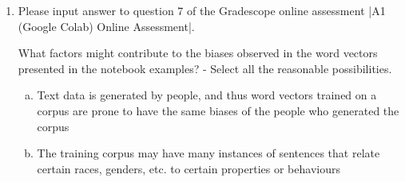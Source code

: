 \begin{enumerate}[1.]
\item {}

Please input answer to question 7 of the Gradescope online assessment |A1 (Google Colab) Online Assessment|.

What factors might contribute to the biases observed in the word vectors presented in the notebook examples? - Select all the reasonable possibilities.

\begin{enumerate}[a.]
\item Text data is generated by people, and thus word vectors trained on a corpus are prone to have the same biases of the people who generated the corpus 
\item The training corpus may have many instances of sentences that relate certain races, genders, etc. to certain properties or behaviours
\end{enumerate}

\end{enumerate}
